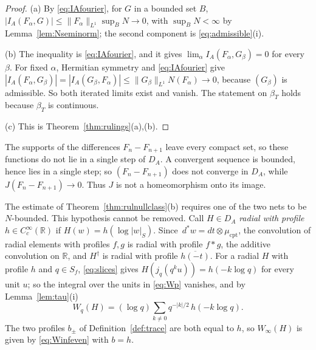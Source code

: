 \documentclass[11pt]{amsart}
\theoremstyle{definition}
\theoremstyle{remark}
\newcommand{\R}{\mathbb R}
\newcommand{\dstar}{\,d^{*}}
\newcommand{\DA}{D_A}
\begin{document}
\begin{proof}
(a)  By \eqref{eq:IAfourier}, for $G$ in a bounded set $B$,
$|I_A(F_{\alpha},G)|\le\lVert F_{\alpha}\rVert_{L^1}\sup_BN\to0$, with
$\sup_BN<\infty$ by Lemma~\ref{lem:Nseminorm}; the second component is
\eqref{eq:admissible}(i).

(b)  The inequality is \eqref{eq:IAfourier}, and it gives
$\lim_{\alpha}I_A(F_{\alpha},G_{\beta})=0$ for every $\beta$.  For fixed
$\alpha$, Hermitian symmetry and \eqref{eq:IAfourier} give
$|I_A(F_{\alpha},G_{\beta})|=|I_A(G_{\beta},F_{\alpha})|\le
\lVert G_{\beta}\rVert_{L^{1}}N(F_{\alpha})\to0$, because $(G_{\beta})$ is
admissible.  So both iterated limits exist and vanish.  The statement on
$\beta_T$ holds because $\beta_T$ is continuous.

(c)  This is Theorem~\ref{thm:rulings}(a),(b).
\end{proof}

The supports of the differences $F_n-F_{n+1}$ leave every compact set, so
these functions do not lie in a single step of $\DA$.  A convergent sequence
is bounded, hence lies in a single step; so $(F_n-F_{n+1})$ does not converge
in $\DA$, while $J(F_n-F_{n+1})\to0$.  Thus
$J$ is not a homeomorphism onto its image.

The estimate of Theorem~\ref{thm:rulnullclass}(b) requires one of the two
nets to be $N$-bounded.  This hypothesis cannot be removed.  Call $H\in\DA$
\emph{radial with profile} $h\in C_c^{\infty}(\R)$ if $H(w)=h(\log|w|_S)$.
Since $\dstar w=dt\otimes\mu_{\mathrm{cpt}}$, the convolution of radial
elements with profiles $f,g$ is radial with profile $f*g$, the additive
convolution on $\R$, and $H^{\dagger}$ is radial with profile
$\overline{h(-t)}$.  For a radial $H$ with profile $h$ and $q\in S_f$,
\eqref{eq:slices} gives $H(j_q(q^{k}u))=h(-k\log q)$ for every unit $u$; so the
integral over the units in \eqref{eq:Wp} vanishes, and by
Lemma~\ref{lem:tau}(i)
\begin{equation}\label{eq:radialS}
W_q(H)=(\log q)\sum_{k\ne0}q^{-|k|/2}\,h(-k\log q).
\end{equation}
The two profiles $b_{\pm}$ of Definition~\ref{def:trace} are both equal to
$h$, so $W_{\infty}(H)$ is given by \eqref{eq:Winfeven} with $b=h$.
\end{document}
